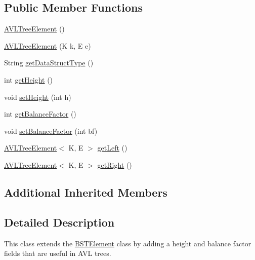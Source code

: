 \subsection*{Public Member Functions}
\begin{DoxyCompactItemize}
\item 
\hyperlink{classbridges_1_1base_1_1_a_v_l_tree_element_a8fe4490d3d5d16991736bd1a7243b904}{A\+V\+L\+Tree\+Element} ()
\item 
\hyperlink{classbridges_1_1base_1_1_a_v_l_tree_element_a060ec94b52675313ad15388e3f292df5}{A\+V\+L\+Tree\+Element} (K k, E e)
\item 
String \hyperlink{classbridges_1_1base_1_1_a_v_l_tree_element_abdd9e63de10732ef46bd5d531bd7f9d8}{get\+Data\+Struct\+Type} ()
\item 
int \hyperlink{classbridges_1_1base_1_1_a_v_l_tree_element_a52fe2886334c841547d238db69022697}{get\+Height} ()
\item 
void \hyperlink{classbridges_1_1base_1_1_a_v_l_tree_element_ac42b744989ed7e18dcbd52980e674b33}{set\+Height} (int h)
\item 
int \hyperlink{classbridges_1_1base_1_1_a_v_l_tree_element_a0478ca0351cd714e8f7b8e49703990c8}{get\+Balance\+Factor} ()
\item 
void \hyperlink{classbridges_1_1base_1_1_a_v_l_tree_element_a0dc3c83e750cc39535afb08ea92f6c98}{set\+Balance\+Factor} (int bf)
\item 
\hyperlink{classbridges_1_1base_1_1_a_v_l_tree_element}{A\+V\+L\+Tree\+Element}$<$ K, E $>$ \hyperlink{classbridges_1_1base_1_1_a_v_l_tree_element_a86f1329b19d2886ba7bf713e3844ecd6}{get\+Left} ()
\item 
\hyperlink{classbridges_1_1base_1_1_a_v_l_tree_element}{A\+V\+L\+Tree\+Element}$<$ K, E $>$ \hyperlink{classbridges_1_1base_1_1_a_v_l_tree_element_aab93418ac19605f2c7c57aa38d110921}{get\+Right} ()
\end{DoxyCompactItemize}
\subsection*{Additional Inherited Members}


\subsection{Detailed Description}
This class extends the \hyperlink{classbridges_1_1base_1_1_b_s_t_element}{B\+S\+T\+Element} class by adding a height and balance factor fields that are useful in A\+V\+L trees. 


